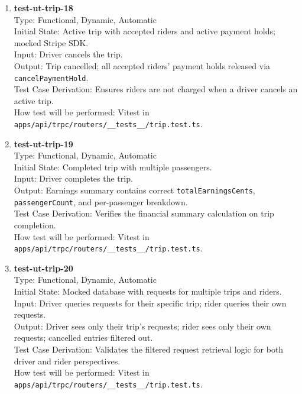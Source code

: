 \documentclass[12pt, titlepage]{article}
\begin{document}
\begin{enumerate}
\item \textbf{test-ut-trip-18}\\
Type: Functional, Dynamic, Automatic\\
Initial State: Active trip with accepted riders and active payment holds; mocked Stripe SDK.\\
Input: Driver cancels the trip.\\
Output: Trip cancelled; all accepted riders' payment holds released via \texttt{cancelPaymentHold}.\\
Test Case Derivation: Ensures riders are not charged when a driver cancels an active trip.\\
How test will be performed: Vitest in \texttt{apps/api/trpc/routers/\_\_tests\_\_/trip.test.ts}.\\

\item \textbf{test-ut-trip-19}\\
Type: Functional, Dynamic, Automatic\\
Initial State: Completed trip with multiple passengers.\\
Input: Driver completes the trip.\\
Output: Earnings summary contains correct \texttt{totalEarningsCents}, \texttt{passengerCount}, and per-passenger breakdown.\\
Test Case Derivation: Verifies the financial summary calculation on trip completion.\\
How test will be performed: Vitest in \texttt{apps/api/trpc/routers/\_\_tests\_\_/trip.test.ts}.\\

\item \textbf{test-ut-trip-20}\\
Type: Functional, Dynamic, Automatic\\
Initial State: Mocked database with requests for multiple trips and riders.\\
Input: Driver queries requests for their specific trip; rider queries their own requests.\\
Output: Driver sees only their trip's requests; rider sees only their own requests; cancelled entries filtered out.\\
Test Case Derivation: Validates the filtered request retrieval logic for both driver and rider perspectives.\\
How test will be performed: Vitest in \texttt{apps/api/trpc/routers/\_\_tests\_\_/trip.test.ts}.\\


\end{enumerate}
\end{document}
